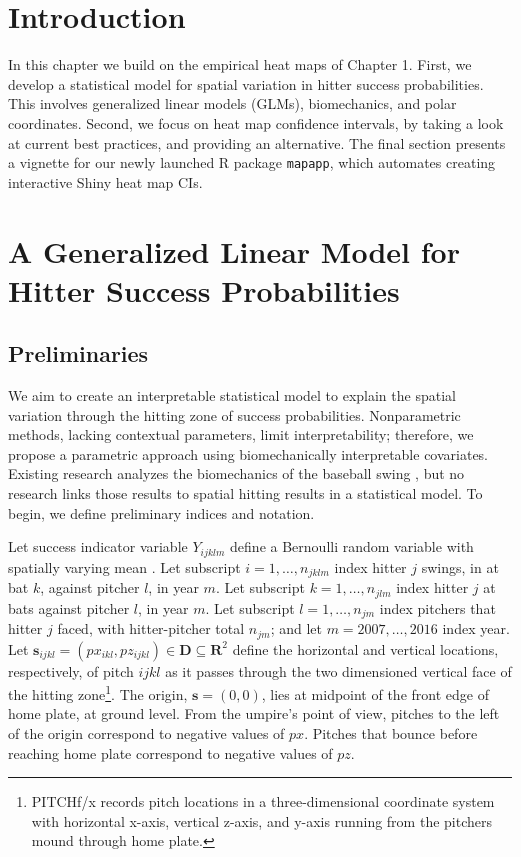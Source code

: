 \section{Introduction}
In this chapter we build on the empirical heat maps of Chapter 1. First, we develop a statistical model for spatial variation in hitter success probabilities. This involves generalized linear models (GLMs), biomechanics, and polar coordinates. Second, we focus on heat map confidence intervals, by taking a look at current best practices, and providing an alternative. The final section presents a vignette for our newly launched R package \verb|mapapp|, which automates creating interactive Shiny heat map CIs.

\section{A Generalized Linear Model for Hitter Success Probabilities} %

\subsection{Preliminaries}

We aim to create an interpretable statistical model to explain the spatial variation through the hitting zone of success probabilities. Nonparametric methods, lacking contextual parameters, limit interpretability; therefore, we propose a parametric approach using biomechanically interpretable covariates. Existing research analyzes the biomechanics of the baseball swing \citep{Welch1995}, but no research links those results to spatial hitting results in a statistical model. To begin, we define preliminary indices and notation.

Let success indicator variable $Y_{ijklm}$ define a Bernoulli random variable with spatially varying mean \citep{Ross2002}. Let subscript $i = 1, \dots, n_{jklm}$ index hitter $j$ swings, in at bat $k$, against pitcher $l$, in year $m$. Let subscript $k = 1, \dots, n_{jlm}$ index hitter $j$ at bats against pitcher $l$, in year $m$. Let subscript $l = 1, \dots, n_{jm}$ index pitchers that hitter $j$ faced, with hitter-pitcher total $n_{jm}$; and let $m = 2007, \dots, 2016$ index year. Let $\pmb{s}_{ijkl} = (px_{ikl}, pz_{ijkl})\in \pmb{D} \subseteq \pmb{R}^{2}$ define the horizontal and vertical locations, respectively, of pitch $ijkl$ as it passes through the two dimensioned vertical face of the hitting zone\footnote{PITCHf/x\textsuperscript{\textregistered} records pitch locations in a three-dimensional coordinate system with horizontal x-axis, vertical z-axis, and y-axis running from the pitchers mound through home plate.}. The origin, $\pmb{s} = (0,0)$, lies at midpoint of the front edge of home plate, at ground level. From the umpire's point of view, pitches to the left of the origin correspond to negative values of $px$. Pitches that bounce before reaching home plate correspond to negative values of $pz$.  

